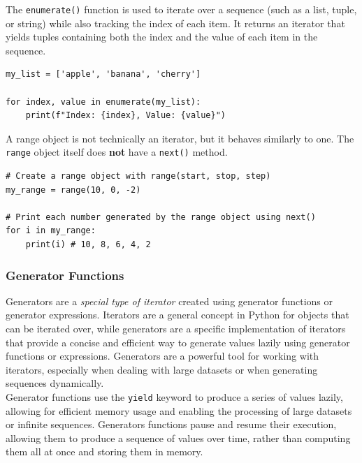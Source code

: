 The \texttt{enumerate()} function is used to iterate over a sequence (such as a list, tuple, or string) while also tracking the index of each item. It returns an iterator that yields tuples containing both the index and the value of each item in the sequence.
\begin{codebox}
\begin{verbatim}
my_list = ['apple', 'banana', 'cherry']

for index, value in enumerate(my_list):
    print(f"Index: {index}, Value: {value}")
\end{verbatim}
\end{codebox}

A range object is not technically an iterator, but it behaves similarly to one. The \texttt{range} object itself does \textbf{not} have a \texttt{next()} method.
\begin{codebox}
\begin{verbatim}
# Create a range object with range(start, stop, step)
my_range = range(10, 0, -2)

# Print each number generated by the range object using next()
for i in my_range:
    print(i) # 10, 8, 6, 4, 2
\end{verbatim}
\end{codebox}

\newpage
\subsubsection{Generator Functions}
Generators are a \textit{special type of iterator} created using generator functions or generator expressions. Iterators are a general concept in Python for objects that can be iterated over, while generators are a specific implementation of iterators that provide a concise and efficient way to generate values lazily using generator functions or expressions. Generators are a powerful tool for working with iterators, especially when dealing with large datasets or when generating sequences dynamically.\\

Generator functions use the \texttt{yield} keyword to produce a series of values lazily, allowing for efficient memory usage and enabling the processing of large datasets or infinite sequences. Generators functions pause and resume their execution, allowing them to produce a sequence of values over time, rather than computing them all at once and storing them in memory.\\

